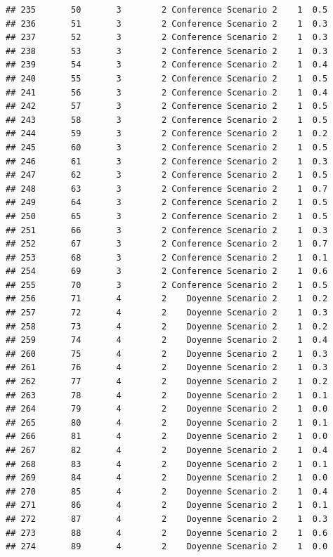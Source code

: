 \documentclass[
]{article}
\begin{document}
\begin{verbatim}
## 235       50       3        2 Conference Scenario 2    1  0.5
## 236       51       3        2 Conference Scenario 2    1  0.3
## 237       52       3        2 Conference Scenario 2    1  0.3
## 238       53       3        2 Conference Scenario 2    1  0.3
## 239       54       3        2 Conference Scenario 2    1  0.4
## 240       55       3        2 Conference Scenario 2    1  0.5
## 241       56       3        2 Conference Scenario 2    1  0.4
## 242       57       3        2 Conference Scenario 2    1  0.5
## 243       58       3        2 Conference Scenario 2    1  0.5
## 244       59       3        2 Conference Scenario 2    1  0.2
## 245       60       3        2 Conference Scenario 2    1  0.5
## 246       61       3        2 Conference Scenario 2    1  0.3
## 247       62       3        2 Conference Scenario 2    1  0.5
## 248       63       3        2 Conference Scenario 2    1  0.7
## 249       64       3        2 Conference Scenario 2    1  0.5
## 250       65       3        2 Conference Scenario 2    1  0.5
## 251       66       3        2 Conference Scenario 2    1  0.3
## 252       67       3        2 Conference Scenario 2    1  0.7
## 253       68       3        2 Conference Scenario 2    1  0.1
## 254       69       3        2 Conference Scenario 2    1  0.6
## 255       70       3        2 Conference Scenario 2    1  0.5
## 256       71       4        2    Doyenne Scenario 2    1  0.2
## 257       72       4        2    Doyenne Scenario 2    1  0.3
## 258       73       4        2    Doyenne Scenario 2    1  0.2
## 259       74       4        2    Doyenne Scenario 2    1  0.4
## 260       75       4        2    Doyenne Scenario 2    1  0.3
## 261       76       4        2    Doyenne Scenario 2    1  0.3
## 262       77       4        2    Doyenne Scenario 2    1  0.2
## 263       78       4        2    Doyenne Scenario 2    1  0.1
## 264       79       4        2    Doyenne Scenario 2    1  0.0
## 265       80       4        2    Doyenne Scenario 2    1  0.1
## 266       81       4        2    Doyenne Scenario 2    1  0.0
## 267       82       4        2    Doyenne Scenario 2    1  0.4
## 268       83       4        2    Doyenne Scenario 2    1  0.1
## 269       84       4        2    Doyenne Scenario 2    1  0.0
## 270       85       4        2    Doyenne Scenario 2    1  0.4
## 271       86       4        2    Doyenne Scenario 2    1  0.1
## 272       87       4        2    Doyenne Scenario 2    1  0.3
## 273       88       4        2    Doyenne Scenario 2    1  0.6
## 274       89       4        2    Doyenne Scenario 2    1  0.0

\end{verbatim}
\end{document}
